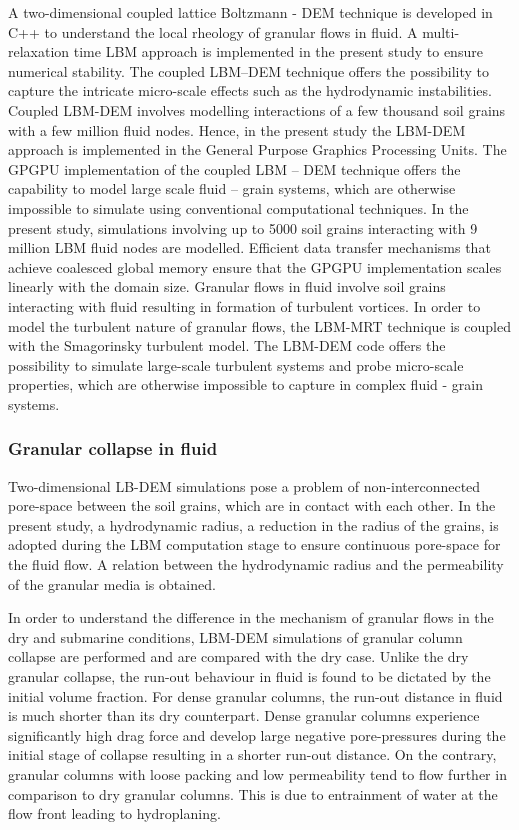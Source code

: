 A two-dimensional coupled lattice Boltzmann - DEM technique is developed in C++ 
to understand the local rheology of granular flows in fluid. A multi-relaxation 
time LBM approach is implemented in the present study to ensure numerical 
stability. The coupled LBM--DEM technique offers the possibility to capture the 
intricate micro-scale effects such as the hydrodynamic instabilities. Coupled 
LBM-DEM involves modelling interactions of a few thousand soil grains with a 
few million fluid nodes. Hence, in the present study the LBM-DEM approach is 
implemented in the General Purpose Graphics Processing Units. The GPGPU 
implementation of the coupled LBM -- DEM technique offers the capability to 
model large scale fluid -- grain systems, which are otherwise impossible to 
simulate using conventional computational techniques. In the present study, 
simulations involving up to 5000 soil grains interacting with 9 million LBM 
fluid nodes are modelled. Efficient data transfer mechanisms that achieve 
coalesced global memory ensure that the GPGPU implementation scales linearly 
with the domain size. Granular flows in fluid involve soil grains interacting 
with fluid resulting in formation of turbulent vortices. In order to model the 
turbulent nature of granular flows, the LBM-MRT technique is coupled with the 
Smagorinsky turbulent model. The LBM-DEM code offers the possibility to 
simulate large-scale turbulent systems and probe micro-scale properties, which 
are otherwise impossible to capture in complex fluid - grain systems.

\subsubsection*{Granular collapse in fluid}

Two-dimensional LB-DEM simulations pose a problem of non-interconnected 
pore-space between the soil grains, which are in contact with each other. In 
the present study, a hydrodynamic radius, a reduction in the radius of the 
grains, is adopted during the LBM computation stage to ensure continuous 
pore-space for the fluid flow. A relation between the hydrodynamic radius and 
the permeability of the granular media is obtained. 

In order to understand the difference in the mechanism of granular flows in the 
dry and submarine conditions, LBM-DEM simulations of granular column collapse 
are performed and are compared with the dry case. Unlike the dry granular 
collapse, the run-out behaviour in fluid is found to be dictated by the initial 
volume fraction. For dense granular columns, the run-out distance in fluid is 
much shorter than its dry counterpart. Dense granular columns experience 
significantly high drag force and develop large negative pore-pressures during 
the initial stage of collapse resulting in a shorter run-out distance. On the 
contrary, granular columns with loose packing and low permeability tend to flow 
further in comparison to dry granular columns. This is due to entrainment of 
water at the flow front leading to hydroplaning. 

